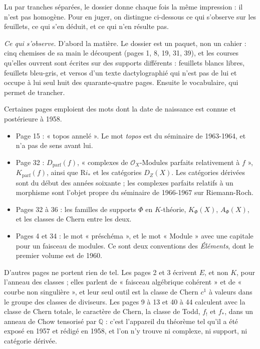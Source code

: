\documentclass[11pt,a4paper]{article}
\begin{document}
Lu par tranches séparées, le dossier donne chaque fois la même impression : il
n'est pas homogène. Pour en juger, on distingue ci-dessous ce qui s'observe sur
les feuillets, ce qui s'en déduit, et ce qui n'en résulte pas.

\emph{Ce qui s'observe.} D'abord la matière. Le dossier est un paquet, non un
cahier : cinq chemises de sa main le découpent (pages 1, 8, 19, 31, 39), et les
courses qu'elles ouvrent sont écrites sur des supports différents : feuillets
blancs libres, feuillets bleu-gris, et versos d'un texte dactylographié qui
n'est pas de lui et occupe à lui seul huit des quarante-quatre pages.
Ensuite le vocabulaire, qui permet de trancher.

Certaines pages emploient des mots dont la date de naissance est connue et
postérieure à 1958.

\begin{itemize}
  \item Page 15 : « topos annelé ». Le mot \emph{topos} est du séminaire de
  1963-1964, et n'a pas de sens avant lui.
  \item Page 32 : $D_{\mathrm{parf}}(f)$, « complexes de
  $\mathcal{O}_{X}$-Modules parfaits relativement à $f$ »,
  $K_{\mathrm{parf}}(f)$, ainsi que $\mathrm{R}i_{*}$ et les catégories
  $D_{Z}(X)$. Les catégories dérivées sont du début des années soixante ; les
  complexes parfaits relatifs à un morphisme sont l'objet propre du séminaire
  de 1966-1967 sur Riemann-Roch.
  \item Pages 32 à 36 : les familles de supports $\Phi$ en $K$-théorie,
  $K_{\Phi}(X)$, $A_{\Phi}(X)$, et les classes de Chern entre les deux.
  \item Pages 4 et 34 : le mot « préschéma », et le mot « Module » avec une
  capitale pour un faisceau de modules. Ce sont deux conventions des
  \emph{Éléments}, dont le premier volume est de 1960.
\end{itemize}

D'autres pages ne portent rien de tel. Les pages 2 et 3 écrivent $E$, et non
$K$, pour l'anneau des classes ; elles parlent de « faisceau algébrique
cohérent » et de « courbe non singulière », et leur seul outil est la classe de
Chern $c^{1}$ à valeurs dans le groupe des classes de diviseurs. Les pages 9 à
13 et 40 à 44 calculent avec la classe de Chern totale, le caractère de Chern,
la classe de Todd, $f_{!}$ et $f_{*}$, dans un anneau de Chow tensorisé par
$\mathbb{Q}$ : c'est l'appareil du théorème tel qu'il a été exposé en 1957 et
rédigé en 1958, et l'on n'y trouve ni complexe, ni support, ni catégorie
dérivée.
\end{document}
